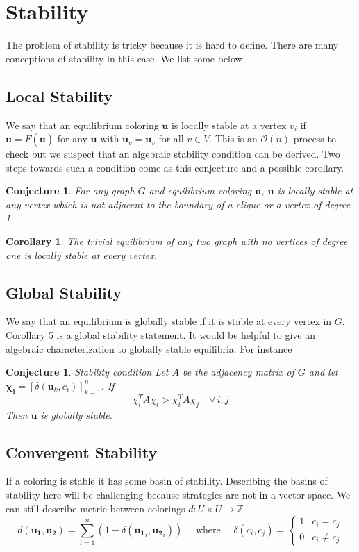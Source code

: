 \documentclass[]{article}
\newtheorem{conjecture}[theorem]{Conjecture}
\newtheorem{corrollary}[theorem]{Corollary}
\begin{document}
\section{Stability}
The problem of stability is tricky because it is hard to define. There are many conceptions of stability in this case. We list some below
\subsection{Local Stability} We say that an equilibrium coloring $\mathbf{u}$ is locally stable at a vertex $v_i$ if $\mathbf{u}=F(\tilde{\mathbf{u}})$ for any $\tilde{\mathbf{u}}$ with $\mathbf{u}_{v}=\tilde{\mathbf{u}}_{v}$ for all $v\in V$. This is an $\mathcal{O}(n)$ process to check but we suspect that an algebraic stability condition can be derived. Two steps towards such a condition come as this conjecture and a possible corollary.
\begin{conjecture}
	For any graph $G$ and equilibrium coloring $\mathbf{u}$, $\mathbf{u}$ is locally stable at any vertex which is not adjacent to the boundary of a clique or a vertex of degree 1. 
\end{conjecture} 
\begin{corrollary}
	The trivial equilibrium of any two graph with no vertices of degree one is locally stable at every vertex.
\end{corrollary}
\subsection{Global Stability}
We say that an equilibrium is globally stable if it is stable at every vertex in $G$. Corollary 5 is a global stability statement. It would be helpful to give an algebraic characterization to globally stable equilibria. For instance

\begin{conjecture}{Stability condition}
		Let $A$ be the adjacency matrix of $G$ and let $\mathbf{\chi_i} = [\delta(\mathbf{u}_k,c_i)]_{k=1}^n$. If \begin{equation}
			\chi_i^TA\chi_i>\chi_i^TA\chi_j\quad \forall \, i, j
		\end{equation}
		Then $\mathbf{u}$ is globally stable. 
	
\end{conjecture}
\subsection{Convergent Stability}
If a coloring is stable it has some basin of stability. Describing the basins of stability here will be challenging because strategies are not in a vector space. We can still describe metric between colorings $d:U\times U \rightarrow \mathbb{Z}$
\begin{equation}
	d(\mathbf{u_1},\mathbf{u_2})=\sum_{i=1}^n (1-\delta(\mathbf{u_1}_i,\mathbf{u_2}_i)) \quad \text{ where }\quad  \delta(c_i,c_j)=\begin{cases}
		1 & c_i=c_j\\
		0 & c_i\neq c_j
	\end{cases}
\end{equation}
\end{document}
